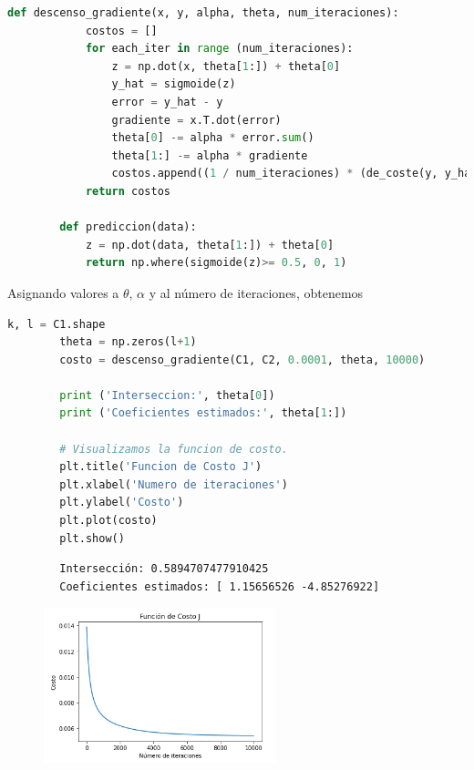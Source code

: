 \documentclass[letterpaper,11pt]{article}
\begin{document}
\begin{enumerate}
\begin{enumerate}
\begin{lstlisting}[language=Python]
        def descenso_gradiente(x, y, alpha, theta, num_iteraciones):
            costos = []
            for each_iter in range (num_iteraciones):
                z = np.dot(x, theta[1:]) + theta[0]
                y_hat = sigmoide(z)
                error = y_hat - y
                gradiente = x.T.dot(error)
                theta[0] -= alpha * error.sum()
                theta[1:] -= alpha * gradiente
                costos.append((1 / num_iteraciones) * (de_coste(y, y_hat)))
            return costos

        def prediccion(data):
            z = np.dot(data, theta[1:]) + theta[0]
            return np.where(sigmoide(z)>= 0.5, 0, 1)
        \end{lstlisting}

        Asignando valores a $\theta$, $\alpha$ y al número de iteraciones, 
        obtenemos
        \begin{lstlisting}[language=Python]
        k, l = C1.shape
        theta = np.zeros(l+1)
        costo = descenso_gradiente(C1, C2, 0.0001, theta, 10000)

        print ('Interseccion:', theta[0])
        print ('Coeficientes estimados:', theta[1:])

        # Visualizamos la funcion de costo.
        plt.title('Funcion de Costo J')
        plt.xlabel('Numero de iteraciones')
        plt.ylabel('Costo')
        plt.plot(costo)
        plt.show()
        \end{lstlisting}

        \begin{verbatim}
        Intersección: 0.5894707477910425
        Coeficientes estimados: [ 1.15656526 -4.85276922]
        \end{verbatim}

        \begin{figure}[ht]
            \centering
            \includegraphics[width=0.6\textwidth]{./imagenes/costo.png}
            \label{coste}
        \end{figure}  


\end{enumerate}
\end{enumerate}
\end{document}
